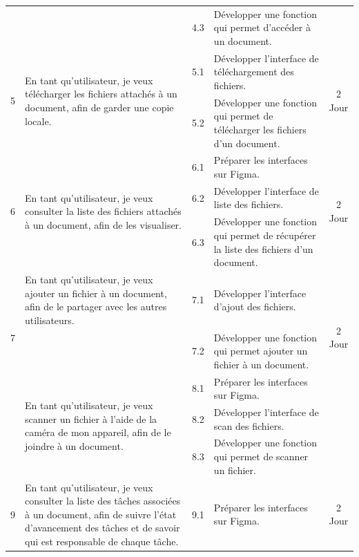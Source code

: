 \begin{adjustwidth}{-1cm}{}
\begin{longtable}{|c|p{6cm}|c|p{6cm}|c|}
      & & 4.3 & Développer une fonction qui permet d'accéder à un document. & \\
      \cline{1-5}
      \multirow{2}{*}{5} & \multirow{2}{6cm}{En tant qu'utilisateur, je veux télécharger les fichiers attachés à un document, afin de garder une copie locale.} & 5.1 & Développer l'interface de téléchargement des fichiers. & \multirow{2}{*}{2 Jour} \\
      \cline{3-4}
      & & 5.2 & Développer une fonction qui permet de télécharger les fichiers d'un document. & \\
      \cline{1-5}
      \multirow{3}{*}{6} & \multirow{3}{6cm}{En tant qu'utilisateur, je veux consulter la liste des fichiers attachés à un document, afin de les visualiser.} & 6.1 & Préparer les interfaces sur Figma. & \multirow{3}{*}{2 Jour} \\
      \cline{3-4}
      & & 6.2 & Développer l'interface de liste des fichiers. & \\
      \cline{3-4}
      & & 6.3 & Développer une fonction qui permet de récupérer la liste des fichiers d'un document. & \\
      \cline{1-5}
      \multirow{3}{*}{7} & En tant qu'utilisateur, je veux ajouter un fichier à un document, afin de le partager avec les autres utilisateurs. & 7.1 & Développer l'interface d'ajout des fichiers. & \multirow{3}{*}{2 Jour} \\
      \cline{3-4}
      & & 7.2 & Développer une fonction qui permet ajouter un fichier à un document. & \\
      \cline{1-5}
      \multirow{3}{*}{8} & \multirow{3}{6cm}{En tant qu'utilisateur, je veux scanner un fichier à l'aide de la caméra de mon appareil, afin de le joindre à un document.} & 8.1 & Préparer les interfaces sur Figma. & \multirow{3}{*}{2 Jour} \\
      \cline{3-4}
      & & 8.2 & Développer l'interface de scan des fichiers. & \\
      \cline{3-4}
      & & 8.3 & Développer une fonction qui permet de scanner un fichier. & \\
      \cline{1-5}
      \multirow{3}{*}{9} & \multirow{3}{6cm}{En tant qu'utilisateur, je veux consulter la liste des tâches associées à un document, afin de suivre l'état d'avancement des tâches et de savoir qui est responsable de chaque tâche.} & 9.1 & Préparer les interfaces sur Figma. & \multirow{3}{*}{2 Jour} \\

\end{longtable}
\end{adjustwidth}
